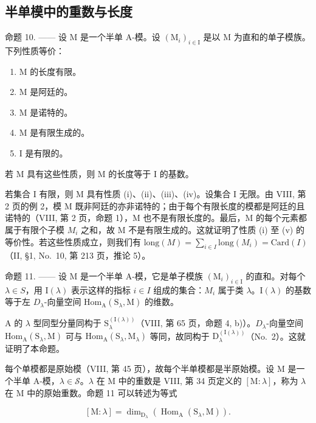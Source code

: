 \subsection{半单模中的重数与长度}

命题 10. —— 设 M 是一个半单 A-模。设 \((\mathrm{M}_{i})_{i\in\mathrm{I}}\) 是以 M 为直和的单子模族。下列性质等价：

\begin{enumerate}
\def\labelenumi{(\roman{enumi})}
\item
  M 的长度有限。
\item
  M 是阿廷的。
\item
  M 是诺特的。
\item
  M 是有限生成的。
\item
  I 是有限的。
\end{enumerate}

若 M 具有这些性质，则 M 的长度等于 I 的基数。

若集合 I 有限，则 M 具有性质 (i)、(ii)、(iii)、(iv)。设集合 I 无限。由 VIII, 第 2 页的例 2，模 M 既非阿廷的亦非诺特的；由于每个有限长度的模都是阿廷的且诺特的（VIII, 第 2 页，命题 1），M 也不是有限长度的。最后，M 的每个元素都属于有限个子模 \(M_{i}\) 之和，故 M 不是有限生成的。这就证明了性质 (i) 至 (v) 的等价性。若这些性质成立，则我们有 \(\text{long}(M) = \sum_{i \in I} \text{long}(M_{i}) = \text{Card}(I)\)（II, §1, No.~10, 第 213 页，推论 5）。

命题 11. —— 设 M 是一个半单 A-模，它是单子模族 \((\mathrm{M}_{i})_{i\in\mathrm{I}}\) 的直和。对每个 \(\lambda\in S\)，用 \(\mathrm{I}(\lambda)\) 表示这样的指标 \(i\in I\) 组成的集合：\(M_{i}\) 属于类 \(\lambda\)。\(\mathrm{I}(\lambda)\) 的基数等于左 \(D_{\lambda}\)-向量空间 \(\mathrm{Hom}_{\mathrm{A}}(\mathrm{S}_{\lambda},\mathrm{M})\) 的维数。

A 的 \(\lambda\) 型同型分量同构于 \(\mathrm{S}_{\lambda}^{(\mathrm{I}(\lambda))}\)（VIII, 第 65 页，命题 4, b)）。\(D_{\lambda}\)-向量空间 \(\mathrm{Hom}_{\mathrm{A}}(\mathrm{S}_{\lambda},\mathrm{M})\) 可与 \(\mathrm{Hom}_{\mathrm{A}}(\mathrm{S}_{\lambda},\mathrm{M}_{\lambda})\) 等同，故同构于 \(\mathrm{D}_{\lambda}^{(\mathrm{I}(\lambda))}\)（No.~2）。这就证明了本命题。

每个单模都是原始模（VIII, 第 45 页），故每个半单模都是半原始模。设 M 是一个半单 A-模，\(\lambda \in \mathcal{S}\)。\(\lambda\) 在 M 中的重数是 VIII, 第 34 页定义的 \([\mathrm{M}:\lambda]\)，称为 \(\lambda\) 在 M 中的原始重数。命题 11 可以转述为等式

\[
[ \mathrm{M}: \lambda ] = \dim_ {\mathrm{D} _ {\lambda}} (\operatorname{Hom} _ {\mathrm{A}} (\mathrm{S} _ {\lambda}, \mathrm{M})).\tag{11}
\]

